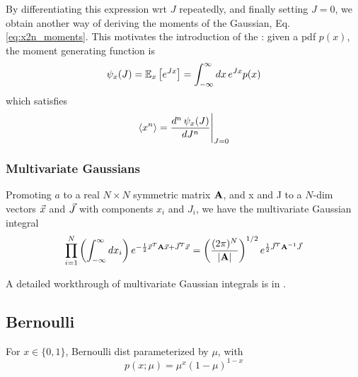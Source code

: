 \documentclass[11pt]{article}
\begin{document}
By differentiating this expression wrt $J$ repeatedly, and finally setting $J=0$, we
obtain another way of deriving the moments of the Gaussian,
Eq. \eqref{eq:x2n_moments}. This motivates the introduction of the : given a pdf $p(x)$, the moment generating function is
\begin{equation}
  \psi_x(J) = \mathbb{E}_x \left[ e^{J x} \right] = \int_{-\infty}^{\infty} dx\, e^{J x} p(x)
\end{equation}
which satisfies
\begin{equation}
  \langle x^n \rangle = \frac{d^n\, \psi_x(J)}{d J^n}\Bigg|_{J=0}
\end{equation}





\subsubsection{Multivariate Gaussians}
Promoting $a$ to a real $N \times N$ symmetric matrix $\mathbf{A}$, and x and J to a $N$-dim
vectors $\vec{x}$ and $\vec{J}$ with components $x_i$ and $J_i$, we have the multivariate
Gaussian integral 
\begin{equation}
  \prod_{i=1}^N \left( \int_{-\infty}^{\infty} dx_i \right)
  e^{-\frac{1}{2} \vec{x}^T \mathbf{A} \vec{x} + \vec{J}^T \vec{x}} =
  \left( \frac{(2 \pi)^N}{|\mathbf{A}|} \right)^{1/2} e^{\frac{1}{2} \vec{J}^T \mathbf{A}^{-1} \vec{J}}
\end{equation}
\TODOFIN{}

A detailed workthrough of multivariate Gaussian integrals is in
\href{http://vixra.org/abs/1404.0026}{}.

\subsection{Bernoulli}
For $x \in \{0, 1\}$, Bernoulli dist parameterized by $\mu$, with
\begin{equation}
  p(x; \mu) = \mu^x (1-\mu)^{1-x}
\end{equation}
\end{document}

